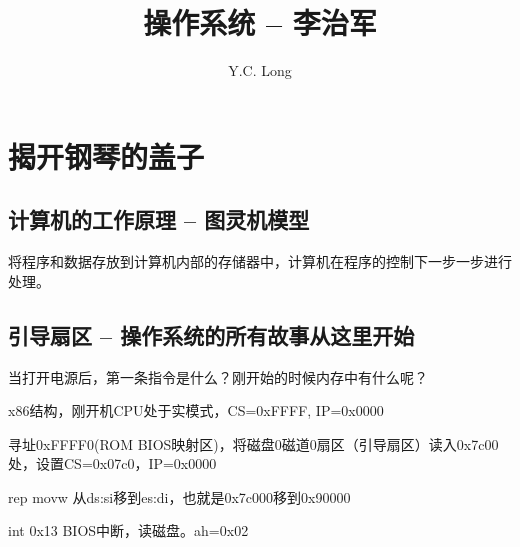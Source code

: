 \documentclass[a4paper]{ctexrep}
\title{操作系统 -- 李治军}
\author{Y.C. Long}
\begin{document}
    \maketitle
    \chapter{揭开钢琴的盖子}

    \section{计算机的工作原理 -- 图灵机模型}

    将程序和数据存放到计算机内部的存储器中，计算机在程序的控制下一步一步进行处理。

    \section{引导扇区 -- 操作系统的所有故事从这里开始}

    当打开电源后，第一条指令是什么？刚开始的时候内存中有什么呢？

    x86结构，刚开机CPU处于实模式，CS=0xFFFF, IP=0x0000

    寻址0xFFFF0(ROM BIOS映射区)，将磁盘0磁道0扇区（引导扇区）读入0x7c00处，设置CS=0x07c0，IP=0x0000

    rep movw 从ds:si移到es:di，也就是0x7c000移到0x90000

    int 0x13 BIOS中断，读磁盘。ah=0x02
\end{document}
